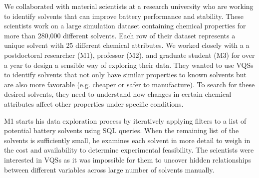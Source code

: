 \par\noindent{} We collaborated with material scientists at a research university who are working to identify solvents that can improve battery performance and stability. These scientists work on a large simulation dataset containing chemical properties for more than 280,000 different solvents. Each row of their dataset represents a unique solvent with 25 different chemical attributes. We worked closely with a a postdoctoral researcher (M1), professor (M2), and graduate student (M3) for over a year to design a sensible way of exploring their data. They wanted to use VQSs to identify solvents that not only have similar properties to known solvents but are also more favorable (e.g. cheaper or safer to manufacture). To search for these desired solvents, they need to understand how changes in certain chemical attributes affect other properties under specific conditions.
\par M1 starts his data exploration process by iteratively applying filters to a list of potential battery solvents using SQL queries. When the remaining list of the solvents is sufficiently small, he examines each solvent in more detail to weigh in the cost and availability to determine experimental feasibility. The scientists were interested in VQSs as it was impossible for them to uncover hidden relationships between different variables across large number of solvents manually.%
